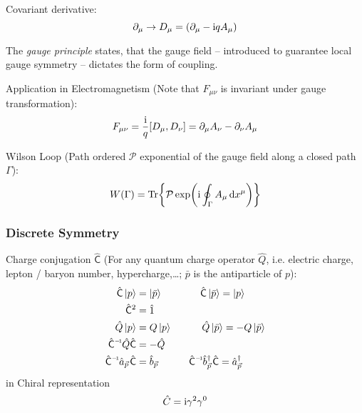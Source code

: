 			\noindent
			Covariant derivative:
			\begin{equation}
				\partial_\mu \to D_\mu = \qty(\partial_\mu - \mathrm{i} q A_\mu) \\
			\end{equation}

			\noindent
			The \emph{gauge principle} states, that the gauge field -- introduced to guarantee local gauge symmetry -- dictates the form of coupling.

			\noindent
			Application in Electromagnetism (Note that $F_{\mu\nu}$ is invariant under gauge transformation):
			\begin{equation}
				F_{\mu\nu} =  \frac{\i}{q} \comm{D_\mu}{D_\nu} = \partial_\mu A_\nu - \partial_\nu A_\mu
			\end{equation}


			\noindent
			Wilson Loop (Path ordered $\mathcal{P}$ exponential of the gauge field along a closed path $\Gamma$):
			\begin{equation}
				W(\Gamma) =\Tr{\mathcal{P}\exp(\mathrm{i}\oint_\Gamma A_\mu \dd{x^\mu})}
			\end{equation}

		\subsubsection{Discrete Symmetry}
			Charge conjugation $\hat{\mathsf{C}}$ (For any quantum charge operator $\hat{Q}$, i.e. electric charge, lepton / baryon number, hypercharge,\dots; $\bar{p}$ is the antiparticle of $p$):
			\begin{equation}
				\begin{aligned}
					\hat{\mathsf{C}} \Ket{p} &= \Ket{\bar{p}}
					\phantom{Q}\hsp \hat{\mathsf{C}} \Ket{\bar{p}} = \Ket{p} \\
					\hat{\mathsf{C}}^2 &= \hat{1} \\
					\hat{Q} \Ket{p} &= Q \Ket{p}
					\hsp \hat{Q} \Ket{\bar{p}} = -Q\Ket{\bar{p}} \\
					\inv{\hat{\mathsf{C}}} \hat{Q} \hat{\mathsf{C}} &= -\hat{Q} \\
					\inv{\hat{\mathsf{C}}}\hat{a}_{\vec{p}} \hat{\mathsf{C}} &= \hat{b}_{\vec{p}}
					\hsp \inv{\hat{\mathsf{C}}}\hat{b}^\dagger_{\vec{p}} \hat{\mathsf{C}} = \hat{a}^\dagger_{\vec{p}} \\
				\end{aligned}
			\end{equation}
			in Chiral representation
			\begin{equation}
				\hat{C} = \mathrm{i} \gamma^2 \gamma^0
			\end{equation}

